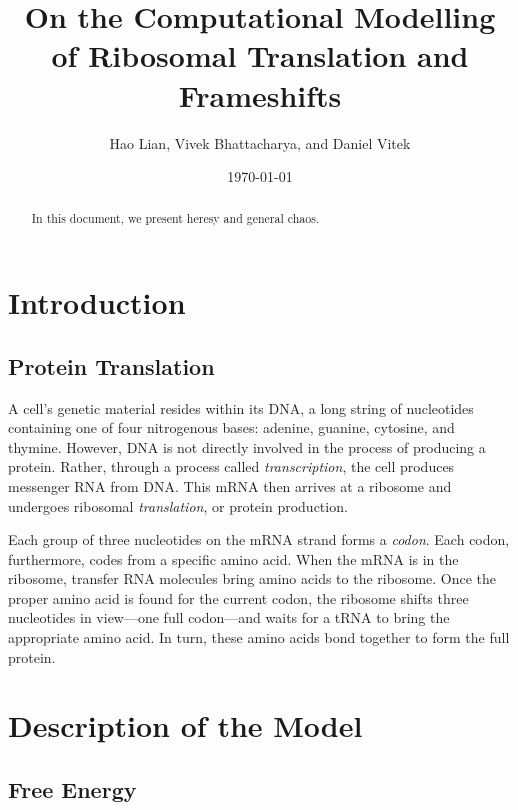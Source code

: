 \documentclass[12pt, draft]{article}
\author{{\sc Hao Lian, Vivek Bhattacharya, and Daniel Vitek}}
\date{{\sc \today}}
\title{{\bf On the Computational Modelling of Ribosomal Translation
    and Frameshifts}}
\numberwithin{equation}{section}
\begin{document}
\maketitle
\tableofcontents
\clearpage

\begin{abstract}
  \begin{normalsize}
    In this document, we present heresy and general chaos.
  \end{normalsize}
\end{abstract}

\clearpage

\section{Introduction}

\subsection{Protein Translation}

A cell's genetic material resides within its DNA, a long string
of nucleotides containing one of four nitrogenous bases: adenine,
guanine, cytosine, and thymine.  However, DNA is not
directly involved in the process of producing a protein.  Rather, through
a process called \emph{transcription}, the cell produces messenger RNA from DNA.
This mRNA then arrives at a ribosome and undergoes ribosomal \emph{translation}, or
protein production.

Each group of three nucleotides on the mRNA strand forms a \emph{codon}.
Each codon, furthermore, codes from a specific amino acid.  When the mRNA
is in the ribosome, transfer RNA molecules bring amino acids
to the ribosome.  Once the proper amino acid is found for the current codon,
the ribosome shifts three nucleotides in view---one full codon---and waits
for a tRNA to bring the appropriate amino acid.  In turn, these amino acids
bond together to form the full protein.

\section{Description of the Model}
\label{allmodel}

\subsection{Free Energy}
\label{freeenergy}
\end{document}
